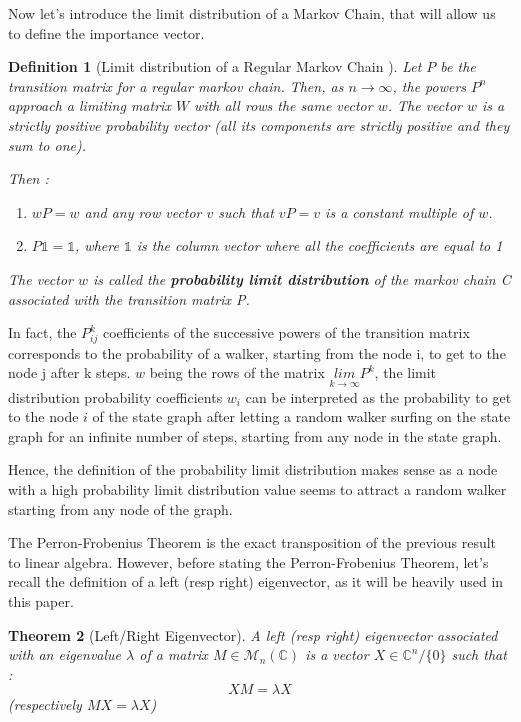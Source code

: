 \documentclass[sn-mathphys]{sn-jnl}%
\theoremstyle{thmstyleone}%
\newtheorem{theo}{Theorem}[section]
\theoremstyle{thmstyletwo}%
\theoremstyle{thmstylethree}%
\newtheorem{definition}[theo]{Definition}
\begin{document}
Now let's introduce the limit distribution of a Markov Chain, that
will allow us to define the importance vector.

\begin{definition}[Limit distribution of a Regular Markov Chain \cite{grinstead_snell_2006}]
  Let $P$ be the transition matrix for a regular markov chain. Then,
  as $n \rightarrow \infty$, the powers $P^n$ approach a limiting
  matrix $W$ with all rows the same vector $w$. The vector $w$ is a
  strictly positive probability vector (all its components are
  strictly positive and they sum to one).

Then :
\begin{enumerate}
    \item $wP = w$ and any row vector $v$ such that $vP = v$ is a constant multiple of $w$.
    \item $P \mathbb{1} = \mathbb{1}$, where $\mathbb{1}$ is the column vector where all the coefficients are equal to 1
\end{enumerate}

The vector $w$ is called the \textbf{probability limit distribution}
of the markov chain C associated with the transition matrix P.

\end{definition}

In fact, the $P^k_{ij}$ coefficients of the successive powers of the
transition matrix corresponds to the probability of a walker, starting
from the node i, to get to the node j after k steps. $w$ being the
rows of the matrix $\underset{k\rightarrow \infty}{lim} P^k$, the
limit distribution probability coefficients $w_i$ can be interpreted
as the probability to get to the node $i$ of the state graph after
letting a random walker surfing on the state graph for an infinite
number of steps, starting from any node in the state graph.

Hence, the definition of the probability limit distribution makes
sense as a node with a high probability limit distribution value seems
to attract a random walker starting from any node of the graph.

The Perron-Frobenius Theorem is the exact transposition of the
previous result to linear algebra. However, before stating the
Perron-Frobenius Theorem, let's recall the definition of a left (resp
right) eigenvector, as it will be heavily used in this paper.

\begin{theo}[Left/Right Eigenvector]\label{theo:limit_distrib_markov_chain}
  A left (resp right) eigenvector associated with an eigenvalue
  $\lambda$ of a matrix $M \in \mathcal{M}_n(\mathbb{C})$ is a vector
  $X \in \mathbb{C}^n / \{0\}$ such that :
\begin{equation*}
    XM = \lambda X
\end{equation*}
(respectively $MX = \lambda X$)
\end{theo}
\end{document}
